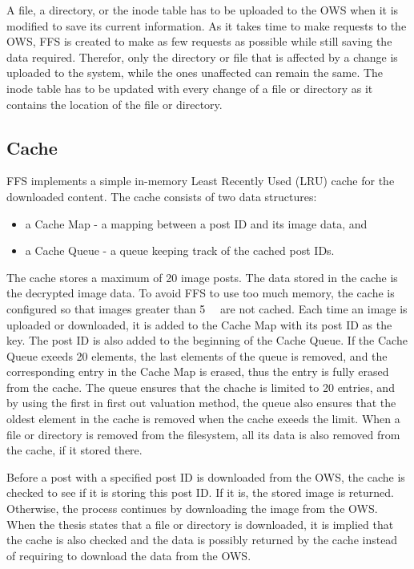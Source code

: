 A file, a directory, or the inode table has to be uploaded to the OWS when it is modified to save its current information. As it takes time to make requests to the OWS, FFS is created to make as few requests as possible while still saving the data required. Therefor, only the directory or file that is affected by a change is uploaded to the system, while the ones unaffected can remain the same. The inode table has to be updated with every change of a file or directory as it contains the location of the file or directory.

\subsection{Cache}
FFS implements a simple in-memory Least Recently Used (\gls{LRU}) cache for the downloaded content. The cache consists of two data structures: 
\begin{itemize}
	\item a Cache Map - a mapping between a post ID and its image data, and
	\item a Cache Queue - a queue keeping track of the cached post IDs.
\end{itemize}
The cache stores a maximum of 20 image posts. The data stored in the cache is the decrypted image data. To avoid FFS to use too much memory, the cache is configured so that images greater than \SI{5}{\mega\byte} are not cached. Each time an image is uploaded or downloaded, it is added to the Cache Map with its post ID as the key. The post ID is also added to the beginning of the Cache Queue. If the Cache Queue exeeds 20 elements, the last elements of the queue is removed, and the corresponding entry in the Cache Map is erased, thus the entry is fully erased from the cache. The queue ensures that the chache is limited to 20 entries, and by using the first in first out valuation method, the queue also ensures that the oldest element in the cache is removed when the cache exeeds the limit. When a file or directory is removed from the filesystem, all its data is also removed from the cache, if it stored there.

Before a post with a specified post ID is downloaded from the OWS, the cache is checked to see if it is storing this post ID. If it is, the stored image is returned. Otherwise, the process continues by downloading the image from the OWS. When the thesis states that a file or directory is downloaded, it is implied that the cache is also checked and the data is possibly returned by the cache instead of requiring to download the data from the OWS.

